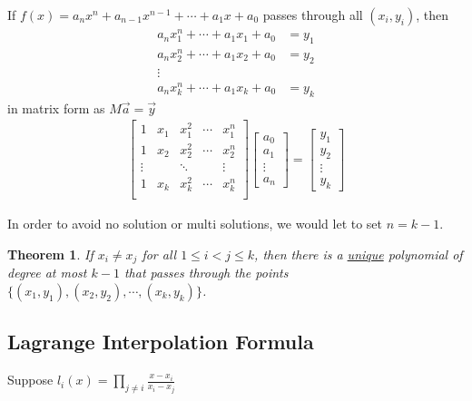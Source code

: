\documentclass[11pt,a4paper]{article}
\newtheorem{theorem}{Theorem}
\begin{document}
If $f(x)=a_nx^n+a_{n-1}x^{n-1}+\cdots+a_1x+a_0$ passes through all $(x_i,y_i)$, then
\begin{equation}
    \begin{aligned}
        a_nx_1^n+\cdots+a_1x_1+a_0&=y_1\\
        a_nx_2^n+\cdots+a_1x_2+a_0&=y_2\\
        \vdots\quad &\\
        a_nx_k^n+\cdots+a_1x_k+a_0&=y_k
    \end{aligned}
    \nonumber
\end{equation}
in matrix form as $M\vec{a}=\vec{y}$
\begin{equation}
    \begin{aligned}
        \begin{bmatrix}
            1&x_1&x_1^2&\cdots&x_1^n\\
            1&x_2&x_2^2&\cdots&x_2^n\\
            \vdots&&\ddots&&\vdots\\
            1&x_k&x_k^2&\cdots&x_k^n\\
        \end{bmatrix}
        \begin{bmatrix}a_0\\a_1\\ \vdots\\a_n\end{bmatrix}=\begin{bmatrix}y_1\\y_2\\ \vdots\\y_k\end{bmatrix}
    \end{aligned}
    \nonumber
\end{equation}

In order to avoid no solution or multi solutions, we would let to set $n=k-1$.

\begin{theorem}
    If $x_i\neq x_j$ for all $1\leq i<j\leq k$, then there is a \underline{unique} polynomial of degree at most $k-1$ that passes through the points $\{(x_1,y_1),(x_2,y_2),\cdots,(x_k,y_k)\}$.
\end{theorem}

\subsection{Lagrange Interpolation Formula}
Suppose $l_i(x)=\prod_{j\neq i}\frac{x-x_i}{x_i-x_j}$
\end{document}
